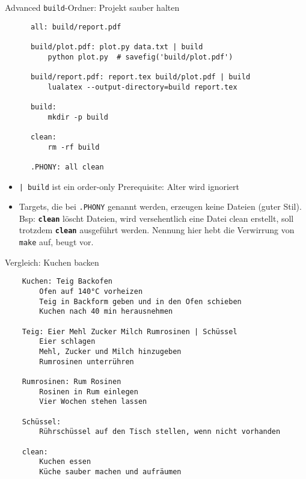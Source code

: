 \begin{frame}[fragile]{Advanced}
  \texttt{build}-Ordner: Projekt sauber halten

  \begin{center}
    \begin{verbatim}
      all: build/report.pdf

      build/plot.pdf: plot.py data.txt | build
          python plot.py  # savefig('build/plot.pdf')

      build/report.pdf: report.tex build/plot.pdf | build
          lualatex --output-directory=build report.tex

      build:
          mkdir -p build

      clean:
          rm -rf build

      .PHONY: all clean
    \end{verbatim}
  \end{center}

  \begin{itemize}
    \item \texttt{| build} ist ein order-only Prerequisite: Alter wird ignoriert
    \item Targets, die bei \texttt{.PHONY} genannt werden, erzeugen keine Dateien (guter Stil).
        Bsp: \textbf{\texttt{clean}} löscht Dateien, wird versehentlich eine Datei clean erstellt,
        soll trotzdem \textbf{\texttt{clean}} ausgeführt werden.
        Nennung hier hebt die Verwirrung von \texttt{make} auf, beugt vor.
  \end{itemize}
\end{frame}

\begin{frame}[fragile]{Vergleich: Kuchen backen}
  \begin{center}
    \begin{verbatim}
    Kuchen: Teig Backofen
        Ofen auf 140°C vorheizen
        Teig in Backform geben und in den Ofen schieben
        Kuchen nach 40 min herausnehmen

    Teig: Eier Mehl Zucker Milch Rumrosinen | Schüssel
        Eier schlagen
        Mehl, Zucker und Milch hinzugeben
        Rumrosinen unterrühren

    Rumrosinen: Rum Rosinen
        Rosinen in Rum einlegen
        Vier Wochen stehen lassen

    Schüssel:
        Rührschüssel auf den Tisch stellen, wenn nicht vorhanden

    clean:
        Kuchen essen
        Küche sauber machen und aufräumen
    \end{verbatim}
  \end{center}
\end{frame}

